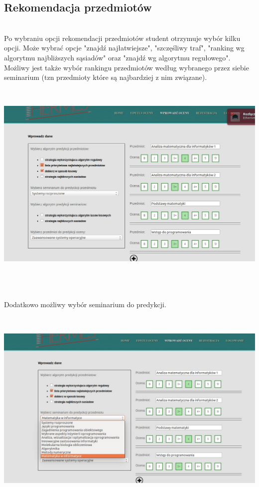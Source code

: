 \documentclass[licencjacka]{pracamgr}
\begin{document}
\subsection{Rekomendacja przedmiotów} ~\\ \indent
Po wybraniu opcji rekomendacji przedmiotów student otrzymuje wybór kilku opcji. Może wybrać opcje "znajdź najłatwiejsze", "szczęśliwy traf", "ranking wg algorytmu najbliższych sąsiadów" oraz "znajdź wg algorytmu regułowego". Możliwy jest także wybór rankingu przedmiotów według wybranego przez siebie seminarium (tzn przedmioty które są najbardziej z nim związane). \par
 ~\\
\begin{minipage}{\linewidth}
	\centering
           \includegraphics[scale=0.5]{rekPrzedm.jpg}
\end{minipage} \\  \\ \\
\indent Dodatkowo możliwy wybór seminarium do predykcji. \par
 ~\\
\begin{minipage}{\linewidth}
	\centering
           \includegraphics[scale=0.5]{rekPrzedSem.jpg}
\end{minipage} \\ 
\end{document}
